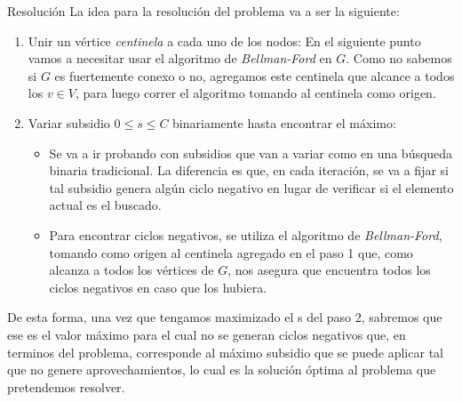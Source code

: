 \begin{subsection}{Resoluci\'{o}n}
La idea para la resoluci\'{o}n del problema va a ser la siguiente:
\begin{enumerate}
	\item{Unir un v\'{e}rtice \textit{centinela} a cada uno de los nodos: En el siguiente punto vamos a necesitar usar el algoritmo de \textit{Bellman-Ford} en $G$. Como no sabemos si $G$ es fuertemente conexo o no,  agregamos este centinela que alcance a todos los $v \in V$, para luego correr el algoritmo tomando al centinela como origen.}
    \item{Variar subsidio $0 \leq s \leq C$ binariamente hasta encontrar el m\'{a}ximo:  
    \begin{itemize}
    	\item{Se va a ir probando con subsidios que van a variar como en una b\'{u}squeda binaria tradicional. La diferencia es que, en cada iteraci\'{o}n, se va a fijar si tal subsidio genera alg\'{u}n ciclo negativo en lugar de verificar si el elemento actual es el buscado.}
    	\item{Para encontrar ciclos negativos, se utiliza el algoritmo de \textit{Bellman-Ford}, tomando como origen al centinela agregado en el paso 1 que, como alcanza a todos los v\'{e}rtices de $G$, nos asegura que encuentra todos los ciclos negativos en caso que los hubiera.}
        \end{itemize}
        }
\end{enumerate}
De esta forma, una vez que tengamos maximizado el s del paso 2, sabremos que ese es el valor m\'{a}ximo para el cual no se generan ciclos negativos que, en terminos del problema, corresponde al m\'{a}ximo subsidio que se puede aplicar tal que no genere aprovechamientos, lo cual es la soluci\'{o}n \'{o}ptima al problema que pretendemos resolver.  
\end{subsection}

